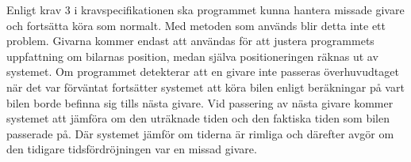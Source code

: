 Enligt krav 3 i kravspecifikationen ska programmet kunna hantera missade givare
och fortsätta köra som normalt. Med metoden som används blir detta inte ett
problem. Givarna kommer endast att användas för att justera programmets
uppfattning om bilarnas position, medan själva positioneringen räknas ut av
systemet. Om programmet detekterar att en givare inte passeras överhuvudtaget när det var förväntat fortsätter systemet att köra bilen enligt beräkningar på vart bilen borde befinna sig tills nästa givare. Vid passering av nästa givare kommer systemet att jämföra om den uträknade tiden och den faktiska tiden som bilen passerade på. Där systemet jämför om tiderna är rimliga och därefter avgör om den tidigare tidsfördröjningen var en missad givare.

